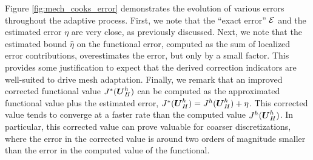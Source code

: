 Figure \ref{fig:mech_cooks_error} demonstrates the evolution of various errors
throughout the adaptive process. First, we note that the ``exact error'' $\mathcal{E}$
and the estimated error $\eta$ are very close, as previously discussed. Next,
we note that the estimated bound $\hat{\eta}$ on the functional error,
computed as the sum of localized error contributions, overestimates the error,
but only by a small factor. This provides some justification to expect that
the derived correction indicators are well-suited to drive mesh adaptation.
Finally, we remark that an improved corrected functional value
$J^*(\boldsymbol{U}^h_H)$ can be computed as the approximated functional value plus
the estimated error, $J^*(\boldsymbol{U}^h_H) = J^h(\boldsymbol{U}^h_H) + \eta$. This
corrected value tends to converge at a faster rate than the computed value
$J^h(\boldsymbol{U}^h_H)$. In particular, this corrected value can prove valuable
for coarser discretizations, where the error in the corrected value is
around two orders of magnitude smaller than the error in the computed
value of the functional.

